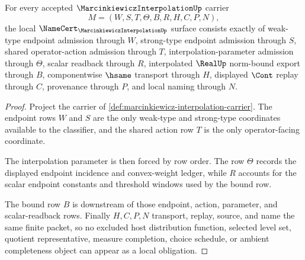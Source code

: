 \begin{theorem}
\label{thm:marcinkiewicz-interpolation-namecert-obligations}
For every accepted $\MarcinkiewiczInterpolationUp$ carrier
$$
M=(W,S,T,\Theta,B,R,H,C,P,N),
$$
the local $\NameCert_{\MarcinkiewiczInterpolationUp}$ surface consists exactly of weak-type endpoint admission through $W$, strong-type endpoint admission through $S$, shared operator-action admission through $T$, interpolation-parameter admission through $\Theta$, scalar readback through $R$, interpolated $\RealUp$ norm-bound export through $B$, componentwise $\hsame$ transport through $H$, displayed $\Cont$ replay through $C$, provenance through $P$, and local naming through $N$.
\end{theorem}
\begin{proof}
Project the carrier of \autoref{def:marcinkiewicz-interpolation-carrier}. The endpoint rows $W$ and $S$ are the only weak-type and strong-type coordinates available to the classifier, and the shared action row $T$ is the only operator-facing coordinate.

The interpolation parameter is then forced by row order. The row $\Theta$ records the displayed endpoint incidence and convex-weight ledger, while $R$ accounts for the scalar endpoint constants and threshold windows used by the bound row.

The bound row $B$ is downstream of those endpoint, action, parameter, and scalar-readback rows. Finally $H,C,P,N$ transport, replay, source, and name the same finite packet, so no excluded host distribution function, selected level set, quotient representative, measure completion, choice schedule, or ambient completeness object can appear as a local obligation.
\end{proof}

